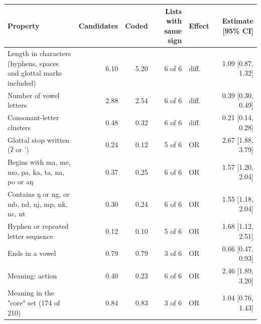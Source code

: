\begin{tabular}{lrrrlr}
\toprule
Property & Candidates & Coded & Lists with same sign & Effect & Estimate [95\% CI] \\
\midrule
Length in characters (hyphens, spaces and glottal marks included) & 6.10 & 5.20 & 6 of 6 & diff. & 1.09 [0.87, 1.32] \\
Number of vowel letters & 2.88 & 2.54 & 6 of 6 & diff. & 0.39 [0.30, 0.49] \\
Consonant-letter clusters & 0.48 & 0.32 & 6 of 6 & diff. & 0.21 [0.14, 0.28] \\
Glottal stop written (ʔ or ') & 0.24 & 0.12 & 5 of 6 & OR & 2.67 [1.88, 3.79] \\
Begins with ma, me, mo, pa, ka, ta, na, po or aŋ & 0.37 & 0.25 & 6 of 6 & OR & 1.57 [1.20, 2.04] \\
Contains ŋ or ng, or mb, nd, nj, mp, nk, nc, nt & 0.30 & 0.24 & 6 of 6 & OR & 1.55 [1.18, 2.04] \\
Hyphen or repeated letter sequence & 0.12 & 0.10 & 5 of 6 & OR & 1.68 [1.12, 2.51] \\
Ends in a vowel & 0.79 & 0.79 & 3 of 6 & OR & 0.66 [0.47, 0.93] \\
Meaning: action & 0.40 & 0.23 & 6 of 6 & OR & 2.46 [1.89, 3.20] \\
Meaning in the "core" set (174 of 210) & 0.84 & 0.83 & 3 of 6 & OR & 1.04 [0.76, 1.43] \\
\bottomrule
\end{tabular}
